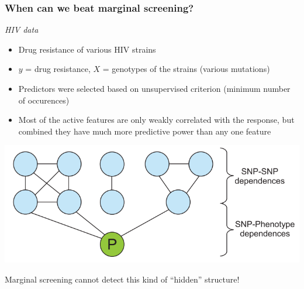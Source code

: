 \documentclass{beamer}
\begin{document}
\begin{frame}
\frametitle{When can we beat marginal screening?}
\emph{HIV data}
\begin{itemize}
\item Drug resistance of various HIV strains
\item $y$ = drug resistance, $X$ = genotypes of the strains (various mutations)
\item Predictors were selected based on unsupervised criterion (minimum number of occurences)
\item Most of the active features are only weakly correlated with the
  response, but combined they have much more predictive power than any
  one feature
\end{itemize}
\begin{center}
\includegraphics[scale = 0.2, trim = 0in 0in 2.8in 0in, clip]{pgm.png}
\end{center}
Marginal screening cannot detect this kind of ``hidden'' structure!
\end{frame}
\end{document}
